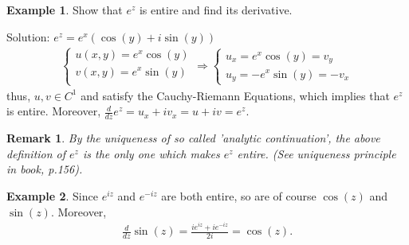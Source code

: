 \documentclass[12pt, a4paper]{article}
\theoremstyle{plain}
\newtheorem{rem}{Remark}
\theoremstyle{definition}
\newtheorem{example}{Example} %
\begin{document}
		\begin{example}
			Show that $e^z$ is entire and find its derivative.

			Solution: $e^z=e^x(\cos(y)+i\sin(y))$
			\begin{align*}
				\begin{cases}
					u(x,y) = e^x\cos(y)\\
					v(x,y) = e^x\sin(y)\\
				\end{cases}\Rightarrow
				\begin{cases}
					u_x = e^x\cos(y) = v_y\\
					u_y = -e^x\sin(y) = -v_x
				\end{cases}
			\end{align*}
			thus, $u,v\in C^1$ and satisfy the Cauchy-Riemann Equations, which implies that $e^z$ is entire. Moreover, $\frac{d}{dz}e^z = u_x+iv_x = u+iv = e^z$.\\
		\end{example}
		\begin{rem}
			By the uniqueness of so called 'analytic continuation', the above definition of $e^z$ is the only one which makes $e^z$ entire. (See uniqueness principle in book, p.156).\\
		\end{rem}

		\begin{example}
			Since $e^{iz}$ and $e^{-iz}$ are both entire, so are of course $\cos(z)$ and $\sin(z)$. Moreover,
			\begin{align*}
				\frac{d}{dz}\sin(z) = \frac{ie^{iz}+ie^{-iz}}{2i} = \cos(z)\tag*{(Chain rule)}.
			\end{align*}
		\end{example}
\end{document}
